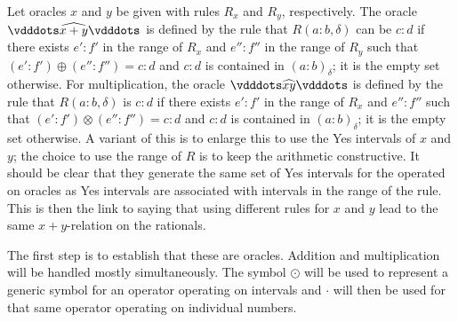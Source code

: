 \documentclass[12pt]{article}
\begin{document}
Let oracles $x$ and $y$ be given with rules $R_x$ and $R_y$, respectively. The oracle $\xora[x+y]$ is defined by the rule that $R(a:b, \delta)$ can be $c:d$ if there exists $e':f'$ in the range of $R_x$ and $e'': f''$ in the range of $R_y$ such that $(e':f') \oplus (e'':f'') = c:d$ and $c:d$ is contained in $(a:b)_\delta$; it is the empty set otherwise. For multiplication, the oracle $\xora[xy]$ is defined by the rule that $R(a:b, \delta)$ is $c:d$ if there exists $e': f'$  in the range of $R_x$ and $e'':f''$ such that $(e':f') \otimes (e'':f'') = c:d$ and $c:d$ is contained in $(a:b)_\delta$; it is the empty set otherwise. A variant of this is to enlarge this to use the Yes intervals of $x$ and $y$; the choice to use the range of $R$ is to keep the arithmetic constructive. It should be clear that they generate the same set of Yes intervals for the operated on oracles as Yes intervals are associated with intervals in the range of the rule. This is then the link to saying that using different rules for $x$ and $y$ lead to the same $x+y$-relation on the rationals. 


The first step is to establish that these are oracles. Addition and multiplication will be handled mostly simultaneously. The symbol $\odot$ will be used to represent a generic symbol for an operator operating on intervals and $\cdot$ will then be used for that same operator operating on individual numbers.
\end{document}
